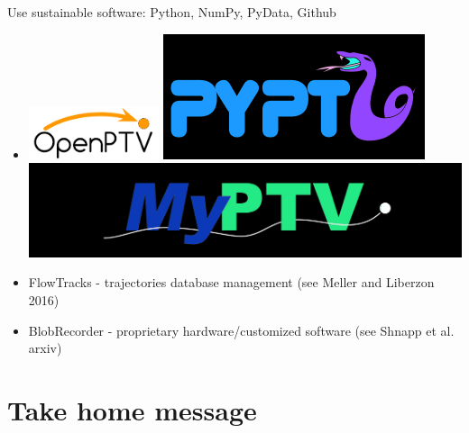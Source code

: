 \documentclass[aspectratio=169]{beamer}
\begin{document}
\begin{frame}[label=opensource-1]{Use sustainable software: Python, NumPy, PyData, Github}
\begin{itemize}
\item \includegraphics[width=0.3\textwidth]{openptv}
 \includegraphics[width=.3\textwidth]{pyptv} \includegraphics[width=.3\textwidth]{fig/myptv_logo.png}
\item FlowTracks - trajectories database management (see Meller and Liberzon 2016)
\item BlobRecorder - proprietary hardware/customized software (see Shnapp et al. arxiv)
\end{itemize}
\end{frame}



\section{Take home message}\label{sec:summary}


\end{document}
